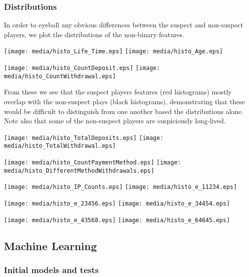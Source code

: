 \documentclass[11pt]{article} %
\begin{document}
\subsubsection{Distributions}

In order to eyeball any obvious differences between the suspect and non-suspect players, we
plot the distributions of the non-binary features.


  \texttt{[image: media/histo\_Life\_Time.eps]}
  \texttt{[image: media/histo\_Age.eps]}

  \texttt{[image: media/histo\_CountDeposit.eps]}
  \texttt{[image: media/histo\_CountWithdrawal.eps]}

  From these we see that the suspect players features (red histograms) mostly
  overlap with the non-suspect plays (black histograms), demonstrating that
  these would be difficult to distinguish from one another based the distributions alone.
  Note also that some of the non-suspect players are suspiciously long-lived.

  
  \texttt{[image: media/histo\_TotalDeposits.eps]}
  \texttt{[image: media/histo\_TotalWithdrawal.eps]}

  \texttt{[image: media/histo\_CountPaymentMethod.eps]}
  \texttt{[image: media/histo\_DifferentMethodWithdrawals.eps]}

  \texttt{[image: media/histo\_IP\_Counts.eps]}
 \texttt{[image: media/histo\_e\_11234.eps]}

 \texttt{[image: media/histo\_e\_23456.eps]}
 \texttt{[image: media/histo\_e\_34454.eps]}

 \texttt{[image: media/histo\_e\_43568.eps]}
\texttt{[image: media/histo\_e\_64645.eps]}

\subsection{Machine Learning}

\subsubsection{Initial models and tests}
\label{moii}
\end{document}
